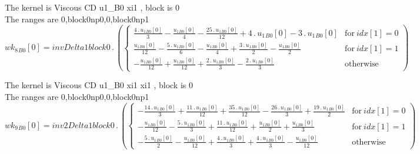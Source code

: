 \documentclass{article}
\begin{document}
\noindent The kernel is Viscous CD u1_B0 xi1 , block is 0\\\noindent The ranges are 0,block0np0,0,block0np1\\\begin{dmath}{wk_{8}{_{B0}}}[{0}] = invDelta1block0 \,.\, \left(\begin{cases} \frac{4 \,.\, {u_{1}{_{B0}}}[{0}]}{3} - \frac{{u_{1}{_{B0}}}[{0}]}{4} - \frac{25 \,.\, {u_{1}{_{B0}}}[{0}]}{12} + 4 \,.\, {u_{1}{_{B0}}}[{0}] - 3 \,.\, {u_{1}{_{B0}}}[{0}] 
& \text{for}\: {idx}[{1}] = 0 \\\frac{{u_{1}{_{B0}}}[{0}]}{12} - \frac{5 \,.\, {u_{1}{_{B0}}}[{0}]}{6} - \frac{{u_{1}{_{B0}}}[{0}]}{4} + \frac{3 \,.\, {u_{1}{_{B0}}}[{0}]}{2} - \frac{{u_{1}{_{B0}}}[{0}]}{2} & \text{for}\: {idx}[{1}] = 1 \\- 
\frac{{u_{1}{_{B0}}}[{0}]}{12} + \frac{{u_{1}{_{B0}}}[{0}]}{12} + \frac{2 \,.\, {u_{1}{_{B0}}}[{0}]}{3} - \frac{2 \,.\, {u_{1}{_{B0}}}[{0}]}{3} & \text{otherwise} \end{cases}\right)\end{dmath}

\noindent The kernel is Viscous CD u1_B0 xi1 xi1 , block is 0\\\noindent The ranges are 0,block0np0,0,block0np1\\\begin{dmath}{wk_{9}{_{B0}}}[{0}] = inv2Delta1block0 \,.\, \left(\begin{cases} - \frac{14 \,.\, {u_{1}{_{B0}}}[{0}]}{3} + \frac{11 \,.\, {u_{1}{_{B0}}}[{0}]}{12} + \frac{35 \,.\, {u_{1}{_{B0}}}[{0}]}{12} - \frac{26 \,.\, {u_{1}{_{B0}}}[{0}]}{3} + 
\frac{19 \,.\, {u_{1}{_{B0}}}[{0}]}{2} & \text{for}\: {idx}[{1}] = 0 \\- \frac{{u_{1}{_{B0}}}[{0}]}{12} - \frac{5 \,.\, {u_{1}{_{B0}}}[{0}]}{3} + \frac{11 \,.\, {u_{1}{_{B0}}}[{0}]}{12} + \frac{{u_{1}{_{B0}}}[{0}]}{2} + \frac{{u_{1}{_{B0}}}[{0}]}{3} 
& \text{for}\: {idx}[{1}] = 1 \\- \frac{5 \,.\, {u_{1}{_{B0}}}[{0}]}{2} - \frac{{u_{1}{_{B0}}}[{0}]}{12} + \frac{4 \,.\, {u_{1}{_{B0}}}[{0}]}{3} + \frac{4 \,.\, {u_{1}{_{B0}}}[{0}]}{3} - \frac{{u_{1}{_{B0}}}[{0}]}{12} & \text{otherwise} 
\end{cases}\right)\end{dmath}
\end{document}
